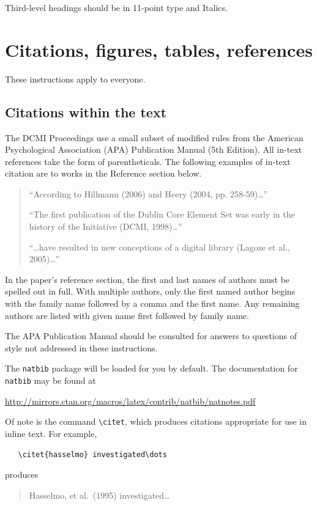 \documentclass[11pt,a4paper]{article}
\begin{document}
Third-level headings should be in 11-point type and Italics.


\section{Citations, figures, tables, references}
\label{others}

These instructions apply to everyone.

\subsection{Citations within the text}

The DCMI Proceedings use a small subset of modified rules from the American Psychological Association (APA) Publication Manual (5th Edition).  All in-text references take the form of parentheticals.  The following examples of in-text citation are to works in the Reference section below.

\begin{quote}
“According to Hillmann (2006) and Heery (2004, pp. 258-59)…” 

“The first publication of the Dublin Core Element Set was early in the history of the Initiative (DCMI, 1998)…”

“…have resulted in new conceptions of a digital library (Lagoze et al., 2005)…”
\end{quote}


In the paper’s reference section, the first and last names of authors must be spelled out in full.  With multiple authors, only the first named author begins with the family name followed by a comma and the first name.  Any remaining authors are listed with given name first followed by family name. 

The APA Publication Manual should be consulted for answers to questions of style not addressed in these instructions.

The \verb+natbib+ package will be loaded for you by default. The documentation for \verb+natbib+ may be found at
\begin{center}
  \url{http://mirrors.ctan.org/macros/latex/contrib/natbib/natnotes.pdf}
\end{center}
Of note is the command \verb+\citet+, which produces citations appropriate for
use in inline text.  For example,
\begin{verbatim}
   \citet{hasselmo} investigated\dots
\end{verbatim}
produces
\begin{quote}
  Hasselmo, et al.\ (1995) investigated\dots
\end{quote}
\end{document}
